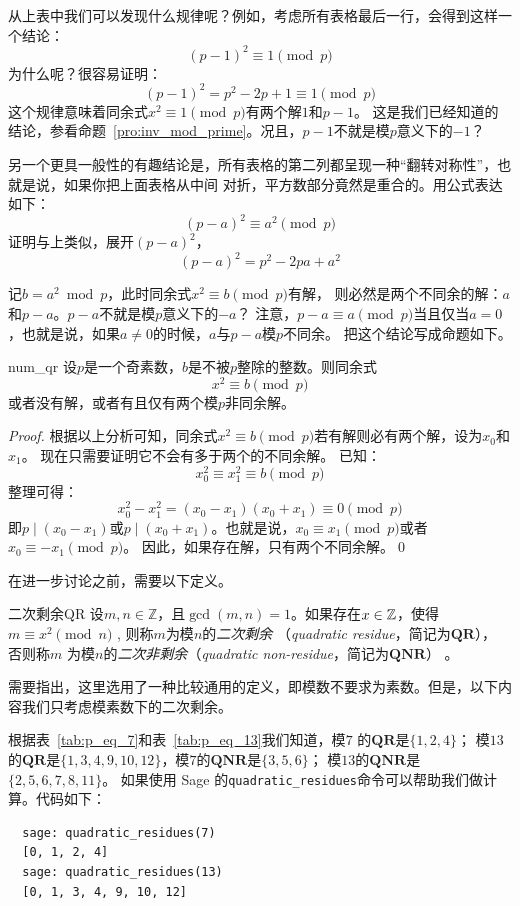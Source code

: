从上表中我们可以发现什么规律呢？例如，考虑所有表格最后一行，会得到这样一个结论：
 \[(p-1)^2 \equiv 1 \pmod{p} \] 
 为什么呢？很容易证明： 
 \[(p-1)^2 = p^2 - 2p + 1 \equiv 1 \pmod{p}\] 
 这个规律意味着同余式$x^2 \equiv 1 \pmod{p}$有两个解$1$和$p - 1$。
 这是我们已经知道的结论，参看命题~\ref{pro:inv_mod_prime}。况且，$p - 1$不就是模$p$意义下的$-1$？
 
另一个更具一般性的有趣结论是，所有表格的第二列都呈现一种“翻转对称性”，也就是说，如果你把上面表格从中间
对折，平方数部分竟然是重合的。用公式表达如下：
 \[(p - a)^2 \equiv a^2 \pmod{p}\]
 证明与上类似，展开$(p - a)^2$，
 \[(p - a)^2  = p^2 - 2pa + a^2\]
 
 记$b = a^2 \bmod p$，此时同余式$x^2 \equiv b \pmod{p}$有解，
 则必然是两个不同余的解：$a$和$p - a$。$p - a$不就是模$p$意义下的$-a$？
 注意，$p-a \equiv a \pmod{p}$当且仅当$a = 0$，也就是说，如果$a \ne 0$的时候，$a$与$p-a$模$p$不同余。
 把这个结论写成命题如下。

 \begin{proposition}{}{num_qr}
 设$p$是一个奇素数，$b$是不被$p$整除的整数。则同余式
 \[x^2 \equiv b \pmod{p} \]
或者没有解，或者有且仅有两个模$p$非同余解。
 \end{proposition}

\begin{proof}
根据以上分析可知，同余式$x^2 \equiv b \pmod{p}$若有解则必有两个解，设为$x_0$和$x_1$。
现在只需要证明它不会有多于两个的不同余解。
已知：
\[x_0 ^ 2 \equiv x_1^2  \equiv b \pmod{p}\]
整理可得：
\[x_0 ^ 2 - x_1^2 = (x_0 - x_1)(x_0 + x_1) \equiv 0 \pmod{p}\]
即$p \mid (x_0 - x_1)$或$p \mid (x_0 + x_1)$。也就是说，$x_0 \equiv x_1 \pmod{p}$或者$x_0 \equiv -x_1 \pmod{p}$。
因此，如果存在解，只有两个不同余解。\qed
\end{proof} 
 
在进一步讨论之前，需要以下定义。
\begin{definition}{二次剩余}{QR}
   设$m,n \in \mathbb{Z}$，且$\gcd(m,n)=1$。如果存在$x \in {\mathbb Z}$，使得$m \equiv x^2 \pmod{n}$ ,
   则称$m$为模$n$的\emph{二次剩余}
   （\emph{quadratic residue}，简记为$\mathbf{QR}$），
   否则称$m$ 为模$n$的\emph{二次非剩余}（\emph{quadratic non-residue}，简记为$\mathbf{QNR}$）
    。
\end{definition}
需要指出，这里选用了一种比较通用的定义，即模数不要求为素数。但是，以下内容我们只考虑模素数下的二次剩余。
  
  \begin{example}
  \label{exm:qr}
  根据表~\ref{tab:p_eq_7}和表~\ref{tab:p_eq_13}我们知道，模$7$ 的$\mathbf{QR}$是$\{1, 2, 4\}$；
  模$13$的$\mathbf{QR}$是$ \{1, 3, 4, 9, 10, 12\}$，模$7$的$\mathbf{QNR}$是$\{3, 5, 6\}$；
  模$13$的$\mathbf{QNR}$是$\{2, 5, 6, 7, 8, 11\}$。
  如果使用 Sage 的\lstinline|quadratic_residues|命令可以帮助我们做计算。代码如下：
  \begin{lstlisting}
  sage: quadratic_residues(7)
  [0, 1, 2, 4]
  sage: quadratic_residues(13)
  [0, 1, 3, 4, 9, 10, 12]
  \end{lstlisting}
  \end{example}


